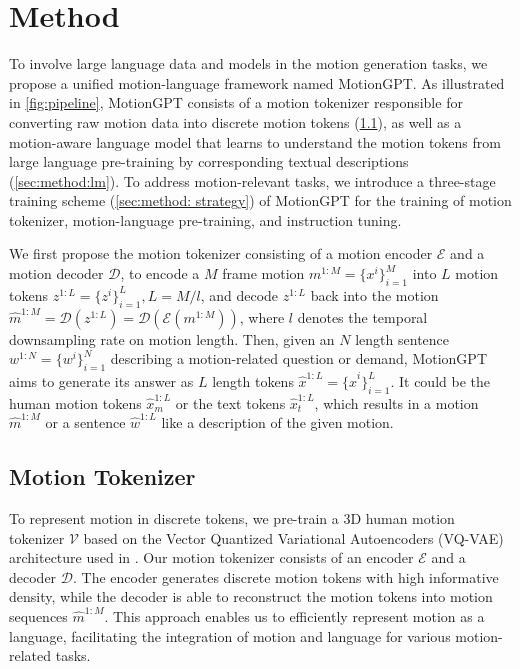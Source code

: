 \section{Method}
\label{method}
To involve large language data and models in the motion generation tasks, we propose a unified motion-language framework named MotionGPT. As illustrated in \cref{fig:pipeline}, MotionGPT consists of a motion tokenizer responsible for converting raw motion data into discrete motion tokens (\cref{sec:method:vqvae}), as well as a motion-aware language model that learns to understand the motion tokens from large language pre-training  by corresponding textual descriptions (\cref{sec:method:lm}). To address motion-relevant tasks, we introduce a three-stage training scheme (\cref{sec:method: strategy}) of MotionGPT for the training of motion tokenizer, motion-language pre-training, and instruction tuning.

We first propose the motion tokenizer consisting of a motion encoder $\mathcal{E}$ and a motion decoder $\mathcal{D}$, to encode a $M$ frame motion ${m}^{1:M}=\{{x}^i\}_{i=1}^{M}$ into $L$ motion tokens ${z}^{1:L}=\{{z}^i\}_{i=1}^{L}, L=M/l$, and decode ${z}^{1:L}$ back into the motion $\hat{m}^{1:M} = \mathcal{D}(z^{1:L}) = \mathcal{D}(\mathcal{E}(m^{1:M}))$, where $l$ denotes the temporal downsampling rate on motion length. Then, given an $N$ length sentence ${w}^{1:N}=\{w^i\}_{i=1}^{N}$ describing a motion-related question or demand, MotionGPT aims to generate its answer as $L$ length tokens $\hat{x}^{1:L}=\{\hat{x}^i\}_{i=1}^{L}$. It could be the human motion tokens $\hat{x}_m^{1:L}$ or the text tokens $\hat{x}_t^{1:L}$, which results in a motion ${\hat{m}}^{1:M}$ or a sentence $\hat{{w}}^{1:L}$
%
like a description of the given motion.

\subsection{Motion Tokenizer}
\label{sec:method:vqvae}

To represent motion in discrete tokens, we pre-train a 3D human motion tokenizer $\mathcal{V}$ based on the Vector Quantized Variational Autoencoders (VQ-VAE) architecture used in \cite{van2017vqvae,siyao2022bailando,chuan2022tm2t,zhang2023generating}. 
%
Our motion tokenizer consists of an encoder $\mathcal{E}$ and a decoder $\mathcal{D}$. The encoder generates discrete motion tokens with high informative density, while the decoder is able to reconstruct the motion tokens into motion sequences $\hat{m}^{1:M}$. This approach enables us to efficiently represent motion as a language, facilitating the integration of motion and language for various motion-related tasks.


